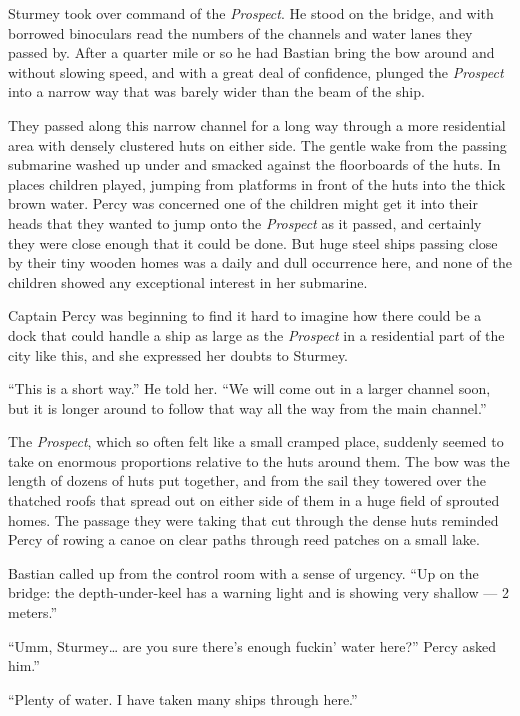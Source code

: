 \documentclass[
]{scrbook}
\begin{document}
Sturmey took over command of the \emph{Prospect}. He stood on the
bridge, and with borrowed binoculars read the numbers of the channels
and water lanes they passed by. After a quarter mile or so he had
Bastian bring the bow around and without slowing speed, and with a great
deal of confidence, plunged the \emph{Prospect} into a narrow way that
was barely wider than the beam of the ship.

They passed along this narrow channel for a long way through a more
residential area with densely clustered huts on either side. The gentle
wake from the passing submarine washed up under and smacked against the
floorboards of the huts. In places children played, jumping from
platforms in front of the huts into the thick brown water. Percy was
concerned one of the children might get it into their heads that they
wanted to jump onto the \emph{Prospect} as it passed, and certainly they
were close enough that it could be done. But huge steel ships passing
close by their tiny wooden homes was a daily and dull occurrence here,
and none of the children showed any exceptional interest in her
submarine.

Captain Percy was beginning to find it hard to imagine how there could
be a dock that could handle a ship as large as the \emph{Prospect} in a
residential part of the city like this, and she expressed her doubts to
Sturmey.

``This is a short way.'' He told her. ``We will come out in a larger
channel soon, but it is longer around to follow that way all the way
from the main channel.''

The \emph{Prospect}, which so often felt like a small cramped place,
suddenly seemed to take on enormous proportions relative to the huts
around them. The bow was the length of dozens of huts put together, and
from the sail they towered over the thatched roofs that spread out on
either side of them in a huge field of sprouted homes. The passage they
were taking that cut through the dense huts reminded Percy of rowing a
canoe on clear paths through reed patches on a small lake.

Bastian called up from the control room with a sense of urgency. ``Up on
the bridge: the depth-under-keel has a warning light and is showing very
shallow --- 2 meters.''

``Umm, Sturmey\ldots{} are you sure there's enough fuckin' water here?''
Percy asked him.''

``Plenty of water. I have taken many ships through here.''
\end{document}
